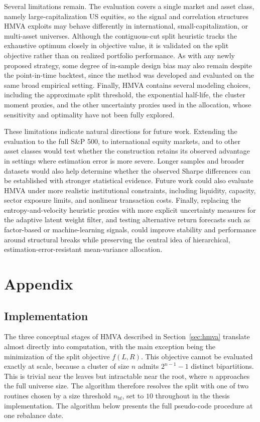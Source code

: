 \documentclass[12pt]{article}
\begin{document}
Several limitations remain. The evaluation covers a single market and asset class, namely large-capitalization US equities, so the signal and correlation structures HMVA exploits may behave differently in international, small-capitalization, or multi-asset universes. Although the contiguous-cut split heuristic tracks the exhaustive optimum closely in objective value, it is validated on the split objective rather than on realized portfolio performance. As with any newly proposed strategy, some degree of in-sample design bias may also remain despite the point-in-time backtest, since the method was developed and evaluated on the same broad empirical setting. Finally, HMVA contains several modeling choices, including the approximate split threshold, the exponential half-life, the cluster moment proxies, and the other uncertainty proxies used in the allocation, whose sensitivity and optimality have not been fully explored.

These limitations indicate natural directions for future work. Extending the evaluation to the full S\&P 500, to international equity markets, and to other asset classes would test whether the construction retains its observed advantage in settings where estimation error is more severe. Longer samples and broader datasets would also help determine whether the observed Sharpe differences can be established with stronger statistical evidence. Future work could also evaluate HMVA under more realistic institutional constraints, including liquidity, capacity, sector exposure limits, and nonlinear transaction costs. Finally, replacing the entropy-and-velocity heuristic proxies with more explicit uncertainty measures for the adaptive latent weight filter, and testing alternative return forecasts such as factor-based or machine-learning signals, could improve stability and performance around structural breaks while preserving the central idea of hierarchical, estimation-error-resistant mean-variance allocation.





\newpage
\section{Appendix}

\subsection{Implementation}
\label{app:pseudo-code}
The three conceptual stages of HMVA described in Section~\ref{sec:hmva} translate almost directly into computation, with the main exception being the minimization of the split objective $f(L,R)$. This objective cannot be evaluated exactly at scale, because a cluster of size $n$ admits $2^{n-1}-1$ distinct bipartitions. This is trivial near the leaves but intractable near the root, where $n$ approaches the full universe size. The algorithm therefore resolves the split with one of two routines chosen by a size threshold $n_{\text{bf}}$, set to $10$ throughout in the thesis implementation. The algorithm below presents the full pseudo-code procedure at one rebalance date.
\end{document}
